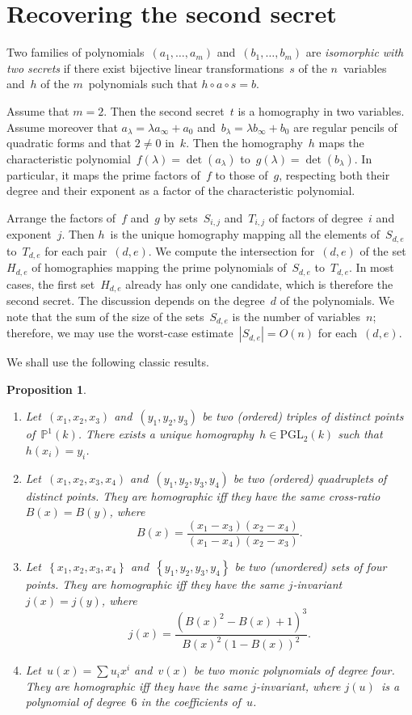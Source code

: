 \documentclass{article}%
\newtheorem{prop}{Proposition}
\def\acco#1{\left\{#1\right\}}
\def\abs#1{\left|#1\right|}
\def\card#1{\abs{#1}}
\begin{document}
\section{Recovering the second secret}

Two families of polynomials~$(a_1,…,a_m)$ and~$(b_1,…,b_m)$ are
\emph{isomorphic with two secrets} if there exist bijective linear
transformations~$s$ of the $n$~variables and~$h$ of the $m$~polynomials
such that $h ∘ a ∘ s = b$.

Assume that $m = 2$. Then the second secret~$t$ is a homography in two
variables. Assume moreover that $a_{λ} = λ a_∞ + a_0$ and~$b_{λ} = λ
b_{∞} + b_0$ are regular pencils of quadratic forms and that $2≠ 0$
in~$k$. Then the homography~$h$ maps the characteristic polynomial~$f(λ)
= \det (a_{λ})$ to~$g(λ) = \det (b_{λ})$. In particular, it maps the
prime factors of~$f$ to those of~$g$, respecting both their degree and
their exponent as a factor of the characteristic polynomial.

Arrange the factors of~$f$ and~$g$ by sets~$S_{i,j}$ and~$T_{i,j}$ of
factors of degree~$i$ and exponent~$j$. Then $h$~is the unique homography
mapping all the elements of~$S_{d,e}$ to~$T_{d,e}$ for each pair~$(d,e)$.
We compute the intersection for~$(d,e)$ of the set~$H_{d,e}$ of
homographies mapping the prime polynomials of~$S_{d,e}$ to~$T_{d,e}$. In
most cases, the first set~$H_{d,e}$ already has only one candidate, which
is therefore the second secret. The discussion depends on the degree~$d$
of the polynomials. We note that the sum of the size of the
sets~$S_{d,e}$ is the number of variables~$n$; therefore, we may use the
worst-case estimate~$\card{S_{d,e}} = O(n)$ for each~$(d,e)$.

We shall use the following classic results.
\begin{prop}\label{prop:homography}
\begin{enumerate}
\item Let~$(x_1, x_2, x_3)$ and~$(y_1, y_2, y_3)$ be two (ordered)
triples of distinct points of~$ℙ^1(k)$. There exists a unique
homography~$h ∈ \mathrm{PGL}_2(k)$ such that~$h(x_i) = y_i$.
\item Let~$(x_1, x_2, x_3, x_4)$ and~$(y_1, y_2, y_3, y_4)$ be two
(ordered) quadruplets of distinct points. They are homographic iff they
have the same cross-ratio~$B(x) = B(y)$, where
\begin{equation}
B(x) = \frac{(x_1-x_3)(x_2-x_4)}{(x_1-x_4)(x_2-x_3)}.
\end{equation}
\item Let~$\acco{x_1, x_2, x_3, x_4}$ and~$\acco{y_1, y_2, y_3, y_4}$ be
two (unordered) sets of four points. They are homographic iff they have
the same $j$-invariant~$j(x) = j(y)$, where
\begin{equation}
j(x) = \frac{(B(x)^2-B(x)+1)^3}{B(x)^2(1-B(x))^2}.
\end{equation}
\item Let~$u(x) = ∑ u_i x^i$ and~$v(x)$ be two monic polynomials
of degree four. They are homographic iff they have the same $j$-invariant,
where $j(u)$~is a polynomial of degree~$6$ in the coefficients of~$u$.
\end{enumerate}
\end{prop}
\end{document}
